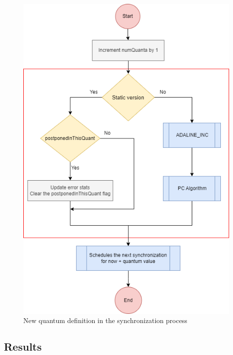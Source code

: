 \begin{figure}[H]
	\centering
 	\includegraphics[width=0.5\linewidth]{Images/NewGlobalSyncEventStatic.png}
 	\caption{New quantum definition in the synchronization process}
	 \label{fig_NewGlobalSyncEventStatic}
\end{figure}

\subsection{Results}























